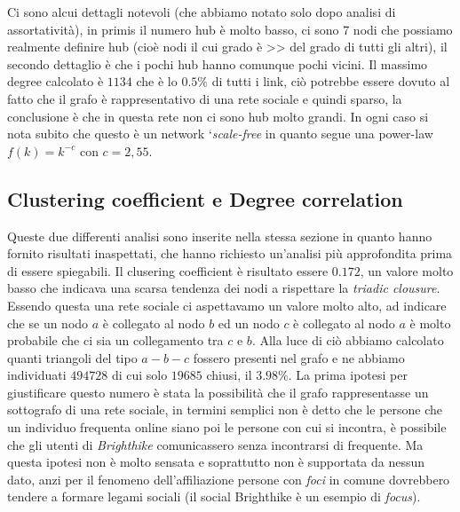 \documentclass[a4paper]{article}
\begin{document}
Ci sono alcui dettagli notevoli (che abbiamo notato solo dopo analisi di assortatività), in primis il numero hub è molto basso, ci sono 7 nodi che possiamo realmente definire hub (cioè nodi il cui grado è >> del grado di tutti gli altri), il secondo dettaglio è che i pochi hub hanno comunque pochi vicini.
Il massimo degree calcolato è $1134$ che è lo $0.5\%$ di tutti i link, ciò potrebbe essere dovuto al fatto che il grafo è rappresentativo di una rete sociale e quindi sparso, la conclusione è che in questa rete non ci sono hub molto grandi.
In ogni caso si nota subito che questo è un network `\textit{scale-free} in quanto segue una power-law $f(k) = k^{-c}$ con $c= 2,55$.
\subsection{Clustering coefficient e Degree correlation}
Queste due differenti analisi sono inserite nella stessa sezione in quanto hanno fornito risultati inaspettati, che hanno richiesto un'analisi più approfondita prima di essere spiegabili.
Il clusering coefficient è risultato essere $0.172$, un valore molto basso che indicava una scarsa tendenza dei nodi a rispettare la \textit{triadic clousure}.
Essendo questa una rete sociale ci aspettavamo un valore molto alto, ad indicare che se un nodo $a$ è collegato al nodo $b$ ed un nodo $c$ è collegato al nodo $a$ è molto probabile che ci sia un collegamento tra $c$ e $b$.
Alla luce di ciò abbiamo calcolato quanti triangoli del tipo $a - b - c$ fossero presenti nel grafo e ne abbiamo individuati $494728$ di cui solo $19685$ chiusi, il $3.98\%$.
La prima ipotesi per giustificare questo numero è stata la possibilità che il grafo rappresentasse un sottografo di una rete sociale, in termini semplici non è detto che le persone che un individuo frequenta online siano poi le persone con cui si incontra, è possibile che gli utenti di \textit{Brighthike} comunicassero senza incontrarsi di frequente.
Ma questa ipotesi non è molto sensata e soprattutto non è supportata da nessun dato, anzi per il fenomeno dell'affiliazione persone con \textit{foci} in comune dovrebbero tendere a formare legami sociali (il social Brighthike è un esempio di \textit{focus}).
\end{document}
